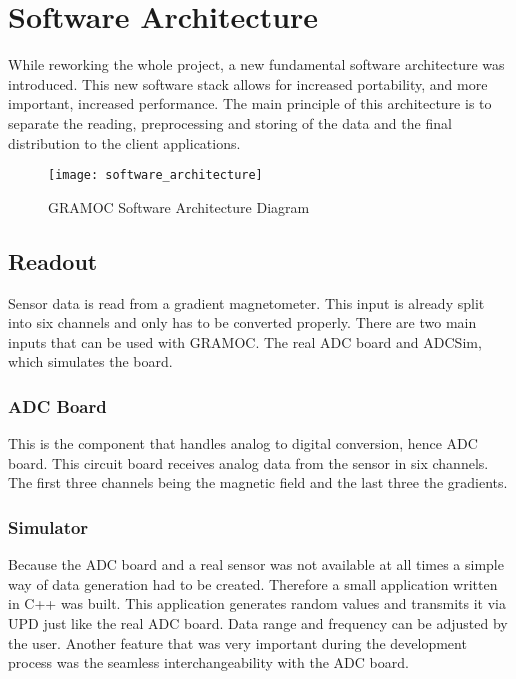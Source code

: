 \chapter{Software Architecture}
\label{ch:Software_Architecture}

While reworking the whole project, a new fundamental software architecture was introduced. This new software stack allows for increased portability, and more important, increased performance. The main principle of this architecture is to separate the reading, preprocessing and storing of the data and the final distribution to the client applications.

\begin{figure}[H]
    \centering
    \texttt{[image: software\_architecture]}
    \caption{GRAMOC Software Architecture Diagram}
    \label{fig:software_architecture}
\end{figure}

\section{Readout}

Sensor data is read from a gradient magnetometer. This input is already split into six channels and only has to be converted properly. There are two main inputs that can be used with GRAMOC. The real ADC board and ADCSim, which simulates the board.

\subsection{ADC Board}

This is the component that handles analog to digital conversion, hence ADC board. This circuit board receives analog data from the sensor in six channels. The first three channels being the magnetic field and the last three the gradients.

\subsection{Simulator}

Because the ADC board and a real sensor was not available at all times a simple way of data generation had to be created. Therefore a small application written in C++ was built. This application generates random values and transmits it via UPD just like the real ADC board. Data range and frequency can be adjusted by the user. Another feature that was very important during the development process was the seamless interchangeability with the ADC board.
